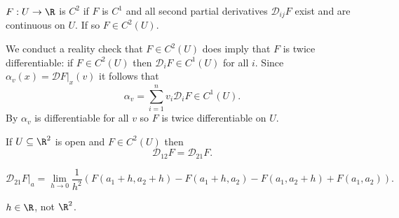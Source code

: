 \documentclass[a4paper]{article}
\newcommand*{\D}{\mathcal{D}}
\theoremstyle{definition}
\begin{document}
\begin{definition}[\(C^2\) space]
  \(F: U \to \R\) is \(C^2\) if \(F\) is \(C^1\) and all second partial derivatives \(\D_{ij} F\) exist and are continuous on \(U\). If so \(F \in C^2(U)\).
\end{definition}

\begin{remark}
  We conduct a reality check that \(F \in C^2(U)\) does imply that \(F\) is twice differentiable: if \(F \in C^2(U)\) then \(\D_i F \in C^1(U)\) for all \(i\). Since \(\alpha_v(x) = \D F|_x(v)\) it follows that
  \[
    \alpha_v = \sum_{i = 1}^{n} v_i \D_i F \in C^1(U).
  \]
  By  \(\alpha_v\) is differentiable for all \(v\) so \(F\) is twice differentiable on \(U\).
\end{remark}

\begin{theorem}
  If \(U \subseteq \R^2\) is open and \(F \in C^2(U)\) then
  \[
    \D_{12} F = \D_{21} F.
  \]
\end{theorem}

\begin{lemma}
  \[
    \D_{21} F|_a = \lim_{h \to 0} \frac{1}{h^2} \left( F(a_1 + h, a_2 + h) - F(a_1 + h, a_2) - F(a_1, a_2 + h) + F(a_1, a_2) \right).
  \]
\end{lemma}

\begin{note}
  \(h \in \R\), not \(\R^2\).
\end{note}
\end{document}

